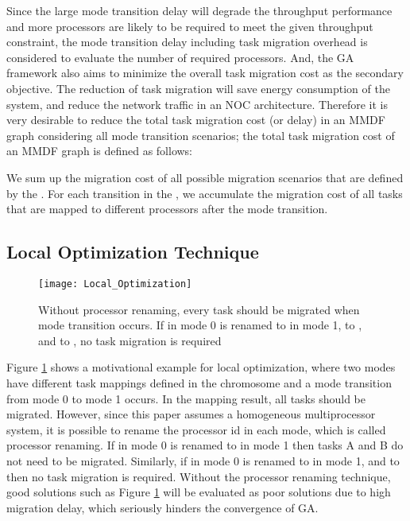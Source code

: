 \documentclass[prodmode,acmtecs]{acmsmall}
\begin{document}
Since the large mode transition delay will degrade the throughput performance and more processors are likely to be required to meet the given throughput constraint, the mode transition delay including task migration overhead is considered to evaluate the number of required processors. And, the GA framework also aims to minimize the overall task migration cost as the secondary objective. The reduction of task migration will save energy consumption of the system, and reduce the network traffic in an NOC architecture. Therefore it is very desirable to reduce the total task migration cost (or delay) in an MMDF graph considering all mode transition scenarios; the total task migration cost of an MMDF graph is defined as follows:

\begin{definition}
\label{Definition:Total task migration cost}

\end{definition}

We sum up the migration cost of all possible migration scenarios that are defined by the . For each transition in the , we accumulate the migration cost of all tasks that are mapped to different processors after the mode transition.

\subsection{Local Optimization Technique}
\label{SubSection:Local Optimization Technique}

\begin{figure} [ht]
\centerline{\texttt{[image: Local\_Optimization]}}
\caption{Without processor renaming, every task should be migrated when mode transition occurs. If  in mode 0 is renamed to  in mode 1,  to , and  to , no task migration is required}
\label{Figure:Local Optimization}
\end{figure}

Figure \ref{Figure:Local Optimization} shows a motivational example for local optimization, where two modes have different task mappings defined in the chromosome and a mode transition from mode 0 to mode 1 occurs. In the mapping result, all tasks should be migrated. However, since this paper assumes a homogeneous multiprocessor system, it is possible to rename the processor id in each mode, which is called processor renaming. If  in mode 0 is renamed to  in mode 1 then tasks A and B do not need to be migrated. Similarly, if  in mode 0 is renamed to  in mode 1, and  to  then no task migration is required. Without the processor renaming technique, good solutions such as Figure \ref{Figure:Local Optimization} will be evaluated as poor solutions due to high migration delay, which seriously hinders the convergence of GA.
\end{document}
